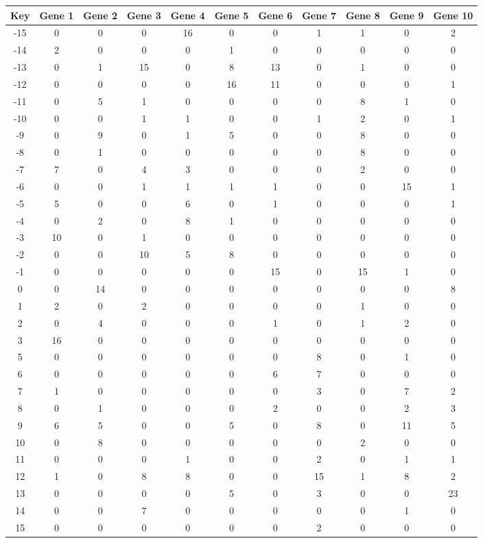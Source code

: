 \begin{tabular}{|c|c|c|c|c|c|c|c|c|c|c|}
\hline
Key & Gene 1 & Gene 2 & Gene 3 & Gene 4 & Gene 5 & Gene 6 & Gene 7 & Gene 8 & Gene 9 & Gene 10 \\
\hline
-15 & 0 & 0 & 0 & 16 & 0 & 0 & 1 & 1 & 0 & 2 \\
-14 & 2 & 0 & 0 & 0 & 1 & 0 & 0 & 0 & 0 & 0 \\
-13 & 0 & 1 & 15 & 0 & 8 & 13 & 0 & 1 & 0 & 0 \\
-12 & 0 & 0 & 0 & 0 & 16 & 11 & 0 & 0 & 0 & 1 \\
-11 & 0 & 5 & 1 & 0 & 0 & 0 & 0 & 8 & 1 & 0 \\
-10 & 0 & 0 & 1 & 1 & 0 & 0 & 1 & 2 & 0 & 1 \\
-9 & 0 & 9 & 0 & 1 & 5 & 0 & 0 & 8 & 0 & 0 \\
-8 & 0 & 1 & 0 & 0 & 0 & 0 & 0 & 8 & 0 & 0 \\
-7 & 7 & 0 & 4 & 3 & 0 & 0 & 0 & 2 & 0 & 0 \\
-6 & 0 & 0 & 1 & 1 & 1 & 1 & 0 & 0 & 15 & 1 \\
-5 & 5 & 0 & 0 & 6 & 0 & 1 & 0 & 0 & 0 & 1 \\
-4 & 0 & 2 & 0 & 8 & 1 & 0 & 0 & 0 & 0 & 0 \\
-3 & 10 & 0 & 1 & 0 & 0 & 0 & 0 & 0 & 0 & 0 \\
-2 & 0 & 0 & 10 & 5 & 8 & 0 & 0 & 0 & 0 & 0 \\
-1 & 0 & 0 & 0 & 0 & 0 & 15 & 0 & 15 & 1 & 0 \\
0 & 0 & 14 & 0 & 0 & 0 & 0 & 0 & 0 & 0 & 8 \\
1 & 2 & 0 & 2 & 0 & 0 & 0 & 0 & 1 & 0 & 0 \\
2 & 0 & 4 & 0 & 0 & 0 & 1 & 0 & 1 & 2 & 0 \\
3 & 16 & 0 & 0 & 0 & 0 & 0 & 0 & 0 & 0 & 0 \\
5 & 0 & 0 & 0 & 0 & 0 & 0 & 8 & 0 & 1 & 0 \\
6 & 0 & 0 & 0 & 0 & 0 & 6 & 7 & 0 & 0 & 0 \\
7 & 1 & 0 & 0 & 0 & 0 & 0 & 3 & 0 & 7 & 2 \\
8 & 0 & 1 & 0 & 0 & 0 & 2 & 0 & 0 & 2 & 3 \\
9 & 6 & 5 & 0 & 0 & 5 & 0 & 8 & 0 & 11 & 5 \\
10 & 0 & 8 & 0 & 0 & 0 & 0 & 0 & 2 & 0 & 0 \\
11 & 0 & 0 & 0 & 1 & 0 & 0 & 2 & 0 & 1 & 1 \\
12 & 1 & 0 & 8 & 8 & 0 & 0 & 15 & 1 & 8 & 2 \\
13 & 0 & 0 & 0 & 0 & 5 & 0 & 3 & 0 & 0 & 23 \\
14 & 0 & 0 & 7 & 0 & 0 & 0 & 0 & 0 & 1 & 0 \\
15 & 0 & 0 & 0 & 0 & 0 & 0 & 2 & 0 & 0 & 0 \\
\hline
\end{tabular}